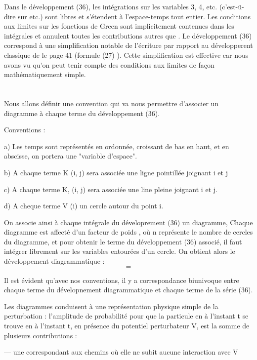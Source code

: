 Dans le développement (36), les intégrations sur les variables 3, 4, etc.
(c'est-ü-dire sur etc.) sont libres et s'étendent à l'espace-temps tout entier.
Les conditions aux limites sur les fonctions de Green
sont implicitement contenues dans les intégrales et annulent toutes les contributions
autres que . Le développement (36) correspond
à une simplification notable de l'écriture par rapport au développerent
classique de le page 41 (formule (27) ). Cette simplification est effective
car nous avons vu qu'on peut tenir compte des conditions aux limites de façon
mathématiquement simple.
\section{}%

Nous allons définir une convention qui va nous permettre d'associer un diagramme à chaque terme du développement (36).

Conventions :

a) Les temps sont représentés en ordonnée, croissant de bas en
haut, et en abscisse, on portera une "variable d'espace".

b) A chaque terme K (i, j) sera associée une ligne pointillée
joignant i et j

c) A chaque terme K, (i, j) sera associée une line pleine joignant i et j.

d) A cheque terme V (i) un cercle autour du point i.

On associe ainsi à chaque intégrale du déveloprement (36) un
diagramme, Chaque diagramme est affecté d'un facteur de poids , où n
représente le nombre de cercles du diagramme, et pour obtenir le terme du
développement (36) associé, il faut intégrer librement sur les variables
entourées d'un cercle. On obtient alors le développement diagrammatique :
\[
\tag{37}=
\]

Il est évident qu'avec nos conventions, il y a correspondance
biunivoque entre chaque terme du dévelopnement diagrammatique et chaque
terme de la série (36).

Les diagrammes conduisent à une représentation physique simple de
la perturbation : l'amplitude de probabilité pour que la particule en
à l'instant t se trouve en à l'instant t, en présence du potentiel
perturbateur V, est la somme de plusieurs contributions :

— une correspondant aux chemins où elle ne subit aucune interaction avec V

